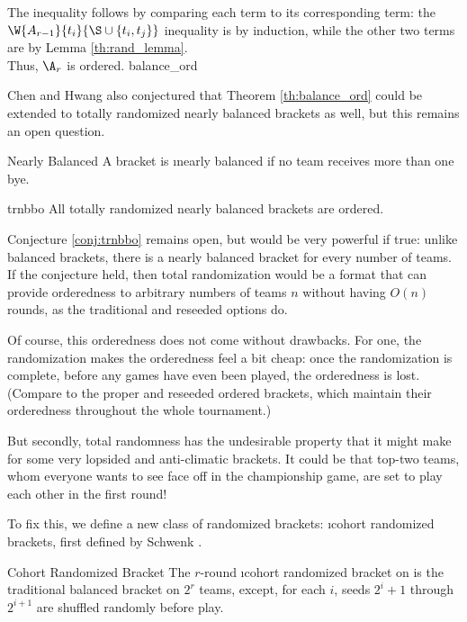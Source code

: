 {{        The inequality follows by comparing each term to its corresponding term: the $\W{A_{r-1}}{t_i}{\S \cup \{t_i, t_j\}}$ inequality is by induction, while the other two terms are by Lemma \ref{th:rand_lemma}.\\

        Thus, $\A_r$ is ordered.
    }{balance_ord}

    Chen and Hwang also conjectured that Theorem \ref{th:balance_ord} could be extended to totally randomized nearly balanced brackets as well, but this remains an open question.

    \begin{definition}{Nearly Balanced}{}
        A bracket is \i{nearly balanced} if no team receives more than one bye.
    \end{definition}

    \begin{conj}{}{trnbbo}
        All totally randomized nearly balanced brackets are ordered.
    \end{conj}

    Conjecture \ref{conj:trnbbo} remains open, but would be very powerful if true: unlike balanced brackets, there is a nearly balanced bracket for every number of teams. If the conjecture held, then total randomization would be a format that can provide orderedness to arbitrary numbers of teams $n$ without having $O(n)$ rounds, as the traditional and reseeded options do.

    Of course, this orderedness does not come without drawbacks. For one, the randomization makes the orderedness feel a bit cheap: once the randomization is complete, before any games have even been played, the orderedness is lost. (Compare to the proper and reseeded ordered brackets, which maintain their orderedness throughout the whole tournament.)
    
    But secondly, total randomness has the undesirable property that it might make for some very lopsided and anti-climatic brackets. It could be that top-two teams, whom everyone wants to see face off in the championship game, are set to play each other in the first round!
    
    To fix this, we define a new class of randomized brackets: \i{cohort randomized brackets}, first defined by Schwenk \cite{randomized_cohort}.
    
    \begin{definition}{Cohort Randomized Bracket}{}
        The $r$-round \i{cohort randomized bracket} on is the traditional balanced bracket on $2^r$ teams, except, for each $i$, seeds $2^i + 1$ through $2^{i+1}$ are shuffled randomly before play.
    \end{definition}

}
